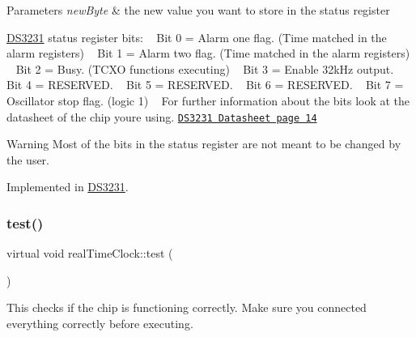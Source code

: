\begin{DoxyParams}{Parameters}
{\em new\+Byte} & the new value you want to store in the status register\\
\hline
\end{DoxyParams}
\mbox{\hyperlink{class_d_s3231}{D\+S3231}} status register bits\+: ~\newline
 Bit 0 = Alarm one flag. (Time matched in the alarm registers) ~\newline
 Bit 1 = Alarm two flag. (Time matched in the alarm registers) ~\newline
 Bit 2 = Busy. (T\+C\+XO functions executing) ~\newline
 Bit 3 = Enable 32k\+Hz output. ~\newline
 Bit 4 = R\+E\+S\+E\+R\+V\+ED. ~\newline
 Bit 5 = R\+E\+S\+E\+R\+V\+ED. ~\newline
 Bit 6 = R\+E\+S\+E\+R\+V\+ED. ~\newline
 Bit 7 = Oscillator stop flag. (logic 1) ~\newline
 For further information about the bits look at the datasheet of the chip you\textquotesingle{}re using. \href{https://datasheets.maximintegrated.com/en/ds/DS3231.pdf}{\tt D\+S3231 Datasheet page 14} \begin{DoxyWarning}{Warning}
Most of the bits in the status register are not meant to be changed by the user. 
\end{DoxyWarning}


Implemented in \mbox{\hyperlink{class_d_s3231_a303a9a5123f66987e209396d60e329e8}{D\+S3231}}.

\mbox{\label{classreal_time_clock_a50cd1b4251b30814575a12269820ab8d}} 
\subsubsection{\texorpdfstring{test()}{test()}}
{\footnotesize\ttfamily virtual void real\+Time\+Clock\+::test (\begin{DoxyParamCaption}{ }\end{DoxyParamCaption})\hspace{0.3cm}{\ttfamily [pure virtual]}}



This checks if the chip is functioning correctly. Make sure you connected everything correctly before executing. 

